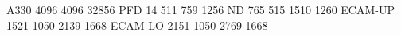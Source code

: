 A330 4096 4096 32856
PFD       14  511  759 1256
ND       765  515 1510 1260
ECAM-UP 1521 1050 2139 1668
ECAM-LO 2151 1050 2769 1668
